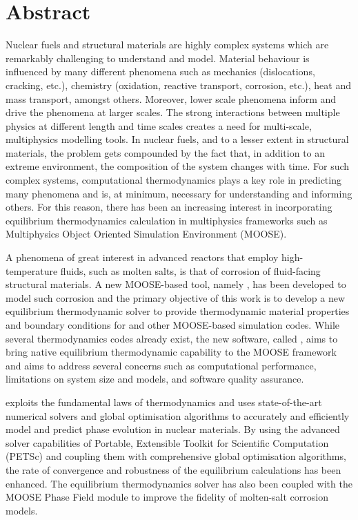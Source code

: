 \chapter*{Abstract}

Nuclear fuels and structural materials are highly complex systems which are remarkably challenging to understand and model. Material behaviour is influenced by many different phenomena such as mechanics (dislocations, cracking, etc.), chemistry (oxidation, reactive transport, corrosion, etc.), heat and mass transport, amongst  others. Moreover, lower scale phenomena inform and drive the phenomena at larger scales. The strong interactions between multiple physics at different length and time scales creates a need for multi-scale, multiphysics modelling tools. In nuclear fuels, and to a lesser extent in structural materials, the problem gets compounded by the fact that, in addition to an extreme environment, the composition of the system changes with time. For such complex systems, computational thermodynamics plays a key role in predicting many phenomena and is, at minimum, necessary for understanding and informing others. For this reason, there has been an increasing interest in incorporating equilibrium thermodynamics calculation in multiphysics frameworks such as Multiphysics Object Oriented Simulation Environment (MOOSE).

A phenomena of great interest in advanced reactors that employ high-temperature fluids, such as molten salts, is that of corrosion of fluid-facing structural materials. A new MOOSE-based tool, namely {\YJ}, has been developed to model such corrosion and the primary objective of this work is to develop a new equilibrium thermodynamic solver to provide thermodynamic material properties and boundary conditions for {\YJ} and other MOOSE-based simulation codes. While several thermodynamics codes already exist, the new software, called {\GEM}, aims to bring native equilibrium thermodynamic capability to the MOOSE framework and aims to address several concerns such as computational performance, limitations on system size and models, and software quality assurance.

{\GEM} exploits the fundamental laws of thermodynamics and uses state-of-the-art numerical solvers and global optimisation algorithms to accurately and efficiently model and predict phase evolution in nuclear materials. By using the advanced solver capabilities of Portable, Extensible Toolkit for Scientific Computation (PETSc) and coupling them with comprehensive global optimisation algorithms, the rate of convergence and robustness of the equilibrium calculations has been enhanced. The equilibrium thermodynamics solver has also been coupled with the MOOSE Phase Field module to improve the fidelity of molten-salt corrosion models.


